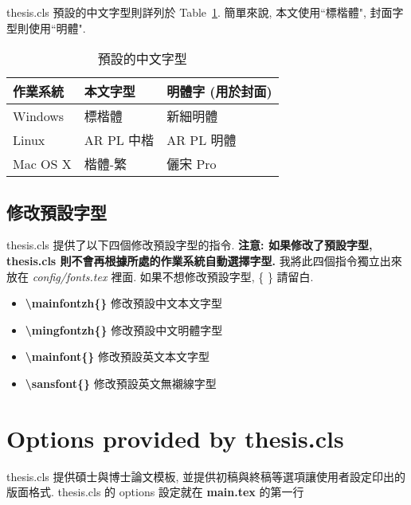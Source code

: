thesis.cls 預設的中文字型則詳列於 Table~\ref{table:zhfonts}.
簡單來說, 本文使用``標楷體", 封面字型則使用``明體".

\begin{table}[h]
\centering
\caption[Default Chinese font settings]{預設的中文字型}
\label{table:zhfonts}
\begin{tabular}{@{}lll@{}}
\toprule
作業系統     & 本文字型     & 明體字 (用於封面) \\ \midrule
Windows  & 標楷體      & 新細明體       \\
Linux    & AR PL 中楷 & AR PL 明體   \\
Mac OS X & 楷體-繁     & 儷宋 Pro     \\ \bottomrule
\end{tabular}
\end{table}

\subsection{修改預設字型}

thesis.cls 提供了以下四個修改預設字型的指令.
\textbf{注意: 如果修改了預設字型, thesis.cls 則不會再根據所處的作業系統自動選擇字型.}
我將此四個指令獨立出來放在 \textit{config/fonts.tex} 裡面.
如果不想修改預設字型, \{ \} 請留白.

\begin{itemize}

\item \textbf{\textbackslash mainfontzh\{\}} 修改預設中文本文字型

\item \textbf{\textbackslash mingfontzh\{\}} 修改預設中文明體字型

\item \textbf{\textbackslash mainfont\{\}} 修改預設英文本文字型

\item \textbf{\textbackslash sansfont\{\}} 修改預設英文無襯線字型

\end{itemize}


\section{Options provided by thesis.cls}

thesis.cls 提供碩士與博士論文模板, 並提供初稿與終稿等選項讓使用者設定印出的版面格式.
thesis.cls 的 options 設定就在 \textbf{main.tex} 的第一行

